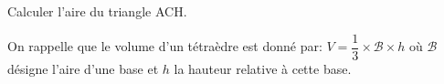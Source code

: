\begin{enumerate}
Calculer l'aire du triangle ACH.

On rappelle que le volume d'un tétraèdre est donné par: $V = \dfrac13 \times \mathcal{B} \times h$ où $\mathcal{B}$ désigne l'aire d'une base et $h$ la hauteur relative à cette base.
\end{enumerate}

\bigskip
